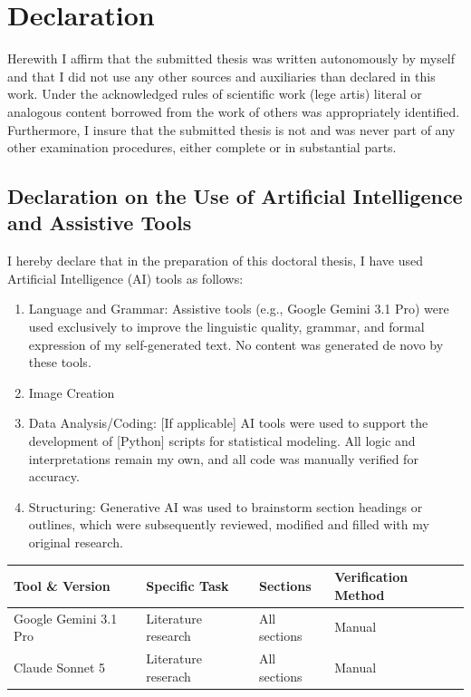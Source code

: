 \thispagestyle{empty}


\section*{Declaration}
Herewith I affirm that the submitted thesis was written autonomously by
myself and that I did not use any other sources and auxiliaries than declared in
this work. Under the acknowledged rules of scientific work (lege artis) literal or
analogous content borrowed from the work of others was appropriately
identified. Furthermore, I insure that the submitted thesis is not and was
never part of any other examination procedures, either complete or in substantial
parts.

\subsection*{Declaration on the Use of Artificial Intelligence and Assistive Tools}
I hereby declare that in the preparation of this doctoral thesis, I have used Artificial
Intelligence (AI) tools as follows:

\begin{enumerate}
    \item Language and Grammar: Assistive tools (e.g., Google Gemini 3.1 Pro) were used exclusively
        to improve the linguistic quality, grammar, and formal expression of my self-generated text.
        No content was generated de novo by these tools.

    \item Image Creation

    \item Data Analysis/Coding: [If applicable] AI tools were used to support the development of
        [Python] scripts for statistical modeling. All logic and interpretations remain my own,
        and all code was manually verified for accuracy.

    \item Structuring: Generative AI was used to brainstorm section headings or outlines, which
        were subsequently reviewed, modified and filled with my original research.
\end{enumerate}

\begin{table}[ht]
    \begin{tabularx}{\textwidth}{lXll}
        \textbf{Tool \& Version} & \textbf{Specific Task} & \textbf{Sections} &
        \textbf{Verification Method}\\
        \toprule
        Google Gemini 3.1 Pro & Literature research & All sections & Manual\\
        Claude Sonnet 5 & Literature reserach & All sections & Manual\\
    \end{tabularx}
\end{table}

